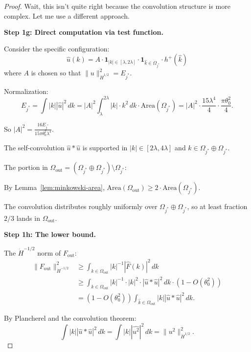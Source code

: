 \documentclass[11pt]{article}
\theoremstyle{definition}
\begin{document}
\begin{proof}
Wait, this isn't quite right because the convolution structure is more complex. Let me use a different approach.

\textbf{Step 1g: Direct computation via test function.}

Consider the specific configuration:
\begin{equation}
\hat{u}(k) = A \cdot \mathbf{1}_{|k| \in [\lambda, 2\lambda]} \cdot \mathbf{1}_{\hat{k} \in \Omega_{j^*}} \cdot h^+(\hat{k})
\end{equation}
where $A$ is chosen so that $\|u\|_{\dot{H}^{1/2}}^2 = E_{j^*}$.

Normalization: 
\begin{equation}
E_{j^*} = \int |k| |\hat{u}|^2 \, dk = |A|^2 \int_{\lambda}^{2\lambda} |k| \cdot k^2 \, dk \cdot \text{Area}(\Omega_{j^*}) = |A|^2 \cdot \frac{15\lambda^4}{4} \cdot \frac{\pi\theta_0^2}{4}.
\end{equation}

So $|A|^2 = \frac{16 E_{j^*}}{15\pi\theta_0^2 \lambda^4}$.

The self-convolution $\hat{u} \ast \hat{u}$ is supported in $|k| \in [2\lambda, 4\lambda]$ and $\hat{k} \in \Omega_{j^*} \oplus \Omega_{j^*}$.

The portion in $\Omega_{\text{out}} = (\Omega_{j^*} \oplus \Omega_{j^*}) \setminus \Omega_{j^*}$:

By Lemma~\ref{lem:minkowski-area}, $\text{Area}(\Omega_{\text{out}}) \geq 2 \cdot \text{Area}(\Omega_{j^*})$.

The convolution distributes roughly uniformly over $\Omega_{j^*} \oplus \Omega_{j^*}$, so at least fraction $2/3$ lands in $\Omega_{\text{out}}$.

\textbf{Step 1h: The lower bound.}

The $\dot{H}^{-1/2}$ norm of $F_{\text{out}}$:
\begin{align}
\|F_{\text{out}}\|_{\dot{H}^{-1/2}}^2 &\geq \int_{\hat{k} \in \Omega_{\text{out}}} |k|^{-1} |\hat{F}(k)|^2 \, dk \\
&\geq \int_{\hat{k} \in \Omega_{\text{out}}} |k|^{-1} \cdot |k|^2 \cdot |\hat{u} \ast \hat{u}|^2 \, dk \cdot (1 - O(\theta_0^2)) \\
&= (1 - O(\theta_0^2)) \int_{\hat{k} \in \Omega_{\text{out}}} |k| |\hat{u} \ast \hat{u}|^2 \, dk.
\end{align}

By Plancherel and the convolution theorem:
\begin{equation}
\int |k| |\hat{u} \ast \hat{u}|^2 \, dk = \int |k| |\widehat{u^2}|^2 \, dk = \|u^2\|_{\dot{H}^{1/2}}^2.
\end{equation}


\end{proof}
\end{document}
